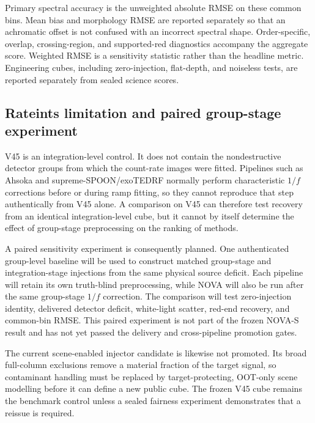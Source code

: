 Primary spectral accuracy is the unweighted absolute RMSE on these common bins.
Mean bias and morphology RMSE are reported separately so that an achromatic
offset is not confused with an incorrect spectral shape. Order-specific,
overlap, crossing-region, and supported-red diagnostics accompany the aggregate
score. Weighted RMSE is a sensitivity statistic rather than the headline
metric. Engineering cubes, including zero-injection, flat-depth, and noiseless
tests, are reported separately from sealed science scores.

\subsection{Rateints limitation and paired group-stage experiment}

V45 is an integration-level control. It does not contain the nondestructive
detector groups from which the count-rate images were fitted. Pipelines such as
Ahsoka and supreme-SPOON/exoTEDRF normally perform characteristic $1/f$
corrections before or during ramp fitting, so they cannot reproduce that step
authentically from V45 alone. A comparison on V45 can therefore test recovery
from an identical integration-level cube, but it cannot by itself determine the
effect of group-stage preprocessing on the ranking of methods.

A paired sensitivity experiment is consequently planned. One authenticated
group-level baseline will be used to construct matched group-stage and
integration-stage injections from the same physical source deficit. Each
pipeline will retain its own truth-blind preprocessing, while NOVA will also be
run after the same group-stage $1/f$ correction. The comparison will test
zero-injection identity, delivered detector deficit, white-light scatter,
red-end recovery, and common-bin RMSE. This paired experiment is not part of the
frozen NOVA-S result and has not yet passed the delivery and cross-pipeline
promotion gates.

The current scene-enabled injector candidate is likewise not promoted. Its
broad full-column exclusions remove a material fraction of the target signal,
so contaminant handling must be replaced by target-protecting, OOT-only scene
modelling before it can define a new public cube. The frozen V45 cube remains
the benchmark control unless a sealed fairness experiment demonstrates that a
reissue is required.


